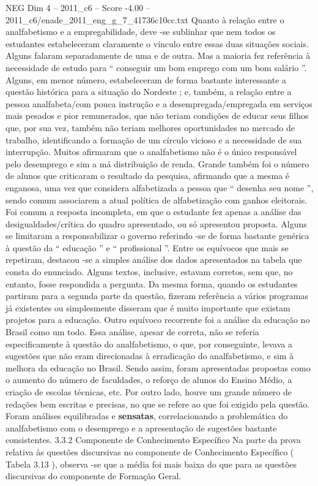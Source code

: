 \begin{textsample}{NEG Dim 4 – 2011\_c6 – Score -4.00 – 2011\_c6/enade\_2011\_eng\_g\_7\_41736c10cc.txt}
Quanto à relação entre o analfabetismo e a empregabilidade, deve -se sublinhar que nem todos os estudantes estabeleceram claramente o vínculo entre essas duas situações sociais.
Alguns falaram separadamente de uma e de outra.
Mas a maioria fez referência à necessidade de estudo para “ conseguir um bom emprego com um bom salário ”.
Alguns, em menor número, estabeleceram de forma bastante interessante a questão histórica para a situação do Nordeste ; e, também, a relação entre a pessoa analfabeta/com pouca instrução e a desempregada/empregada em serviços mais pesados e pior remunerados, que não teriam condições de educar seus filhos que, por sua vez, também não teriam melhores oportunidades no mercado de trabalho, identificando a formação de um círculo vicioso e a necessidade de sua interrupção.
Muitos afirmaram que o analfabetismo não é o único responsável pelo desemprego e sim a má distribuição de renda.
Grande também foi o número de alunos que criticaram o resultado da pesquisa, afirmando que a mesma é enganosa, uma vez que considera alfabetizada a pessoa que “ desenha seu nome ”, sendo comum associarem a atual política de alfabetização com ganhos eleitorais.
Foi comum a resposta incompleta, em que o estudante fez apenas a análise das desigualdades/crítica do quadro apresentado, ou só apresentou proposta.
Alguns se limitaram a responsabilizar o governo referindo -se de forma bastante genérica à questão da “ educação ” e “ profissional ”.
Entre os equívocos que mais se repetiram, destacou -se a simples análise dos dados apresentados na tabela que consta do enunciado.
Alguns textos, inclusive, estavam corretos, sem que, no entanto, fosse respondida a pergunta.
Da mesma forma, quando os estudantes partiram para a segunda parte da questão, fizeram referência a vários programas já existentes ou simplesmente disseram que é muito importante que existam projetos para a educação.
Outro equívoco recorrente foi a análise da educação no Brasil como um todo.
Essa análise, apesar de correta, não se referia especificamente à questão do analfabetismo, o que, por conseguinte, levava a sugestões que não eram direcionadas à erradicação do analfabetismo, e sim à melhora da educação no Brasil.
Sendo assim, foram apresentadas propostas como o aumento do número de faculdades, o reforço de alunos do Ensino Médio, a criação de escolas técnicas, etc.
Por outro lado, houve um grande número de redações bem escritas e precisas, no que se refere ao que foi exigido pela questão.
Foram análises equilibradas e \textbf{sensatas}, correlacionando a problemática do analfabetismo com o desemprego e a apresentação de sugestões bastante consistentes. 3.3.2 Componente de Conhecimento Específico Na parte da prova relativa às questões discursivas no componente de Conhecimento Específico ( Tabela 3.13 ), observa -se que a média foi mais baixa do que para as questões discursivas do componente de Formação Geral.

\end{textsample}
